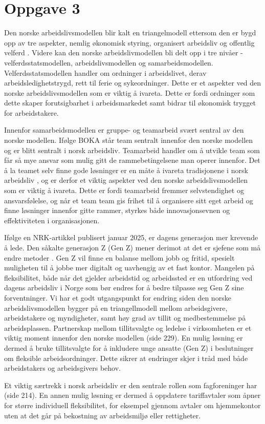 \section{Oppgave 3}
Den norske arbeidslivsmodellen blir kalt en triangelmodell ettersom den er bygd opp av tre aspekter, nemlig økonomisk styring, organisert arbeidsliv og offentlig velferd \cite{Teknologiledelse}. Videre kan den norske arbeidslivmodellen bli delt opp i tre nivåer - velferdsstatsmodellen, arbeidslivsmodellen og samarbeidsmodellen. Velferdsstatsmodellen handler om ordninger i arbeidslivet, derav arbeidsledighetstrygd, rett til ferie og sykeordninger. Dette er et aspekter ved den norske arbeidslivsmodellen som er viktig å ivareta. Dette er fordi ordninger som dette skaper forutsigbarhet i arbeidsmarkedet samt bidrar til økonomisk trygget for arbeidstakere.
 
Innenfor samarbeidsmodellen er gruppe- og teamarbeid svært sentral av den norske modellen. Ifølge BOKA står team sentralt innenfor den norske modellen og er blitt sentralt i norsk arbeidsliv. Teamarbeid handler om å utvikle team som får så mye ansvar som mulig gitt de rammebetingelsene man operer innenfor. Det å la teamet selv finne gode løsninger er en måte å ivareta tradisjonene i norsk arbeidsliv \cite{BOKA}, og er derfor et viktig aspekter ved den norske arbeidslivsmodellen som er viktig å ivareta. Dette er fordi teamarbeid fremmer selvstendighet og ansvarsfølelse, og når et team team gis frihet til å organisere sitt eget arbeid og finne løsninger innenfor gitte rammer, styrkes både innovasjonsevnen og effektiviteten i organisasjonen.
 
Ifølge en NRK-artikkel publisert januar 2025, er dagens generasjon mer krevende å lede. Den såkalte generasjon Z (Gen Z) mener derimot at det er sjefene som må endre metoder \cite{NRK}. Gen Z vil finne en balanse mellom jobb og fritid, spesielt muligheten til å jobbe mer digitalt og uavhengig av et fast kontor.  Mangelen på fleksibilitet, både når det gjelder arbeidstid og arbeidssted er en utfordring ved dagens arbeidsliv i Norge som bør endres for å bedre tilpasse seg Gen Z sine forventninger. Vi har et godt utgangspunkt for endring siden den norske arbeidslivsmodellen bygger på en triangellmodell mellom arbeidsgivere, arbeidstakere og myndigheter, samt høy grad av tillit og medbestemmelse på arbeidsplassen. Partnerskap mellom tillitsvalgte og ledelse i virksomheten er et viktig moment innenfor den norske modellen \cite{Teknologiledelse} (side 229). En mulig løsning er dermed å bruke tillitsvalgte for å inkludere unge ansatte (Gen Z) i beslutninger om fleksible arbeidsordninger. Dette sikrer at endringer skjer i tråd med både arbeidstakers og arbeidsgivers behov.
 
 
Et viktig særtrekk i norsk arbeidsliv er den sentrale rollen som fagforeninger har \cite{Teknologiledese} (side 214). En annen mulig løsning er dermed å oppdatere tariffavtaler som åpner for større individuell fleksibilitet, for eksempel gjennom avtaler om hjemmekontor uten at det går på bekostning av arbeidsmiljø eller rettigheter. 